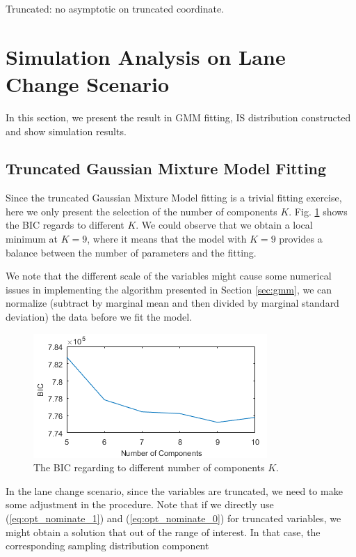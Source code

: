 \documentclass[conference]{IEEEtran}
\begin{document}
Truncated: no asymptotic on truncated coordinate.

\section{Simulation Analysis on Lane Change Scenario}\label{sec:result}

In this section, we present the result in GMM fitting, IS distribution constructed and show simulation results.

\subsection{Truncated Gaussian Mixture Model Fitting}
Since the truncated Gaussian Mixture Model fitting is a trivial fitting exercise, here we only present the selection of the number of components $K$. Fig. \ref{fig:bic} shows the BIC regards to different $K$. We could observe that we obtain a local minimum at $K=9$, where it means that the model with $K=9$ provides a balance between the number of parameters and the fitting. 

We note that the different scale of the variables might cause some numerical issues in implementing the algorithm presented in Section \ref{sec:gmm}, we can normalize (subtract by marginal mean and then divided by marginal standard deviation) the data before we fit the model.

\begin{figure}[t]
	\centering
	\includegraphics[width=\linewidth]{BIC_plot.png}
	\caption{The BIC regarding to different number of components $K$.}
	\label{fig:bic}
\end{figure}

In the lane change scenario, since the variables are truncated, we need to make some adjustment in the procedure. Note that if we directly use (\ref{eq:opt_nominate_1}) and (\ref{eq:opt_nominate_0}) for truncated variables, we might obtain a solution that out of the range of interest. In that case, the corresponding sampling distribution component 
\end{document}
